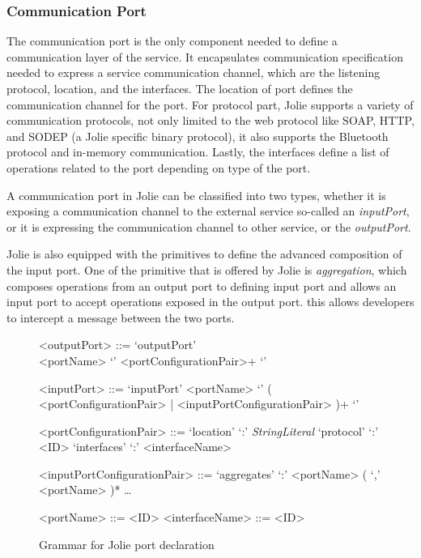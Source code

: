 \subsubsection{Communication Port}

The communication port is the only component needed to define a communication layer of the service.
It encapsulates communication specification needed to express a service communication channel, which are the listening protocol, location, and the interfaces. The location of port defines the communication channel for the port. For protocol part, Jolie supports a variety of communication protocols, not only limited to the web protocol like SOAP, HTTP, and SODEP (a Jolie specific binary protocol), it also supports the Bluetooth protocol and in-memory communication. Lastly, the interfaces define a list of operations related to the port depending on type of the port.

A communication port in Jolie can be classified into two types, whether it is exposing a communication channel to the external service so-called an \textit{inputPort}, or it is expressing the communication channel to other service, or the \textit{outputPort}.

Jolie is also equipped with the primitives to define the advanced composition of the input port. One of the primitive that is offered by Jolie is \textit{aggregation}, which composes operations from an output port to defining input port and allows an input port to accept operations exposed in the output port. this allows developers to intercept a message between the two ports.

\begin{figure}[]
    \begin{framed}
        \begin{grammar}

            <outputPort> ::= `outputPort' \\ <portName> `{' <portConfigurationPair>+ `}'

            <inputPort>
            ::= `inputPort' <portName> `{' ( <portConfigurationPair> | <inputPortConfigurationPair> )+ `}'

            <portConfigurationPair>
            ::= `location' `:' \textit{StringLiteral}
            \alt `protocol' `:' <ID>
            \alt `interfaces' `:' <interfaceName>

            <inputPortConfigurationPair>
            ::=  `aggregates' `:' <portName> ( `,' <portName> )* \alt \dots

            <portName> ::= <ID>
            <interfaceName> ::= <ID>

        \end{grammar}
    \end{framed}
    \caption{Grammar for Jolie port declaration}
\end{figure}

